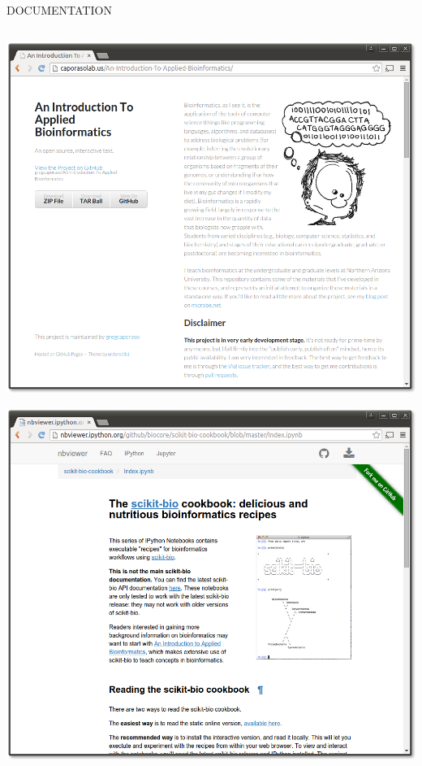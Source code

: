 \documentclass[final,t]{beamer}
\begin{document}
\begin{frame}{}
\begin{columns}[t]
\begin{column}{.3\linewidth}
\begin{block}{\uppercase{Documentation}}
\begin{columns}
\begin{column}{.45\linewidth}
\begin{minipage}[c][15cm][c]{\linewidth}
                    \includegraphics[width=1\linewidth]{assets/iab}\\
                \end{minipage}
                        \begin{minipage}[c][15cm][c]{\linewidth}
                    \includegraphics[width=1\linewidth]{assets/cookbook}
                \end{minipage}
                \end{column}
            \end{columns}


\end{block}
\end{column}
\end{columns}
\end{frame}
\end{document}
